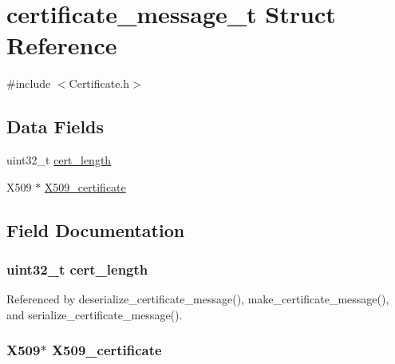 \hypertarget{structcertificate__message__t}{}\section{certificate\+\_\+message\+\_\+t Struct Reference}
\label{structcertificate__message__t}


{\ttfamily \#include $<$Certificate.\+h$>$}

\subsection*{Data Fields}
\begin{DoxyCompactItemize}
\item 
uint32\+\_\+t \hyperlink{structcertificate__message__t_ab534aa9b18ddd479ee8603fd8a0e3e07}{cert\+\_\+length}
\item 
X509 $\ast$ \hyperlink{structcertificate__message__t_aa02d32568d177ce73429e6cff12fa7b2}{X509\+\_\+certificate}
\end{DoxyCompactItemize}


\subsection{Field Documentation}
\subsubsection[{\texorpdfstring{cert\+\_\+length}{cert_length}}]{\setlength{\rightskip}{0pt plus 5cm}uint32\+\_\+t cert\+\_\+length}\hypertarget{structcertificate__message__t_ab534aa9b18ddd479ee8603fd8a0e3e07}{}\label{structcertificate__message__t_ab534aa9b18ddd479ee8603fd8a0e3e07}


Referenced by deserialize\+\_\+certificate\+\_\+message(), make\+\_\+certificate\+\_\+message(), and serialize\+\_\+certificate\+\_\+message().

\subsubsection[{\texorpdfstring{X509\+\_\+certificate}{X509_certificate}}]{\setlength{\rightskip}{0pt plus 5cm}X509$\ast$ X509\+\_\+certificate}\hypertarget{structcertificate__message__t_aa02d32568d177ce73429e6cff12fa7b2}{}\label{structcertificate__message__t_aa02d32568d177ce73429e6cff12fa7b2}


